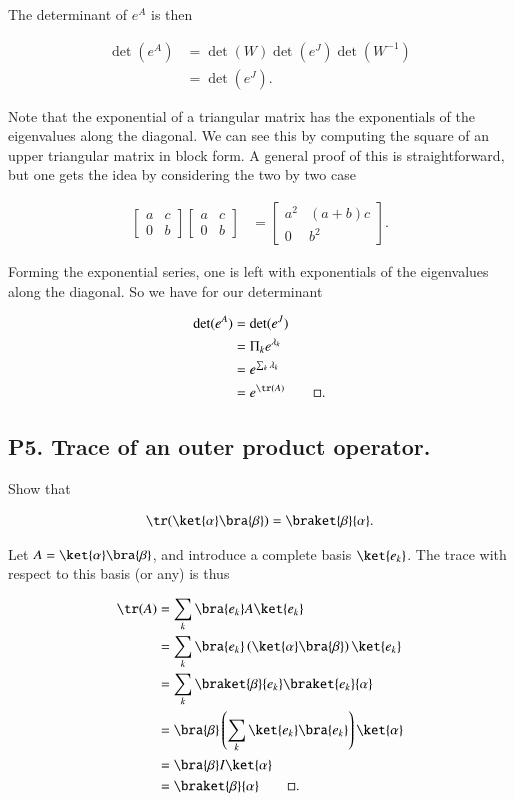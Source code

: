 The determinant of $e^A$ is then

\begin{align*}
\det(e^A) 
&=
\det(W) \det(e^J) \det(W^{-1}) \\
&=
\det(e^J).
\end{align*}

Note that the exponential of a triangular matrix has the exponentials of the eigenvalues along the diagonal.  We can see this by computing the square of an upper triangular matrix in block form.  A general proof of this is straightforward, but one gets the idea by considering the two by two case

\begin{align*}
\begin{bmatrix}
a & c \\
0 & b
\end{bmatrix}
\begin{bmatrix}
a & c \\
0 & b
\end{bmatrix}
&=
\begin{bmatrix}
a^2 & (a + b)c \\
0 & b^2
\end{bmatrix}.
\end{align*}

Forming the exponential series, one is left with exponentials of the eigenvalues along the diagonal.  So we have for our determinant

\begin{align*}
\det(e^A) 
&=
\det(e^J) \\
&=
\Pi_k e^{\lambda_k} \\
&=
e^{\sum_k \lambda_k} \\
&=
e^{\tr(A)} \qquad \square.
\end{align*}

\subsection{P5. Trace of an outer product operator.}

Show that 

\begin{align*}
\tr( \ket{\alpha}\bra{\beta} ) = \braket{\beta}{\alpha}.
\end{align*}

Let $A = \ket{\alpha}\bra{\beta}$, and introduce a complete basis $\ket{e_k}$.  The trace with respect to this basis (or any) is thus

\begin{align*}
\tr(A) 
&= \sum_k \bra{e_k} A \ket{e_k} \\
&= \sum_k \bra{e_k} \left( \ket{\alpha} \bra{\beta} \right) \ket{e_k} \\
&= \sum_k \braket{\beta} {e_k} \braket{e_k} {\alpha} \\
&= \bra{\beta} \left( \sum_k \ket{e_k} \bra{e_k} \right) \ket{\alpha} \\
&= \bra{\beta} I \ket{\alpha} \\
&= \braket{\beta} {\alpha} \qquad \square.
\end{align*}

